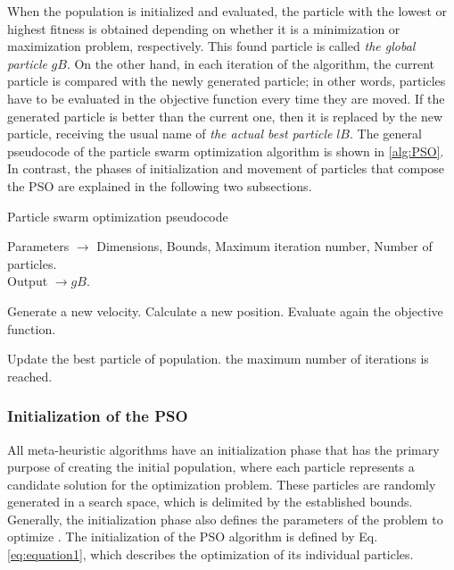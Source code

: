 When the population is initialized and evaluated, the particle with the lowest or highest fitness is obtained depending on whether it is a minimization or maximization problem, respectively. This found particle is called \textit{the global particle} $gB$. On the other hand, in each iteration of the algorithm, the current particle is compared with the newly generated particle; in other words, particles have to be evaluated in the objective function every time they are moved. If the generated particle is better than the current one, then it is replaced by the new particle, receiving the usual name of \textit{the actual best particle} $lB$. The general pseudocode of the particle swarm optimization algorithm is shown in \ref{alg:PSO}. In contrast, the phases of initialization and movement of particles that compose the PSO are explained in the following two subsections.\\

\begin{algorithm}[h!]
\caption{Particle swarm optimization pseudocode}
Parameters $\rightarrow$ Dimensions, Bounds, Maximum iteration number, Number of particles.\\
Output $\rightarrow gB$.   
\begin{algorithmic}[1]
\REPEAT
{}

\STATE Generate a new velocity.
\STATE Calculate a new position.
\STATE Evaluate again the objective function.
\ENDFOR
		
\STATE Update the best particle of population.
\UNTIL the maximum number of iterations is reached.
\end{algorithmic}
\label{alg:PSO}
\end{algorithm}

\newpage

\subsubsection{Initialization of the PSO}

All meta-heuristic algorithms have an initialization phase that has the primary purpose of creating the initial population, where each particle represents a candidate solution for the optimization problem. These particles are randomly generated in a search space, which is delimited by the established bounds. Generally, the initialization phase also defines the parameters of the problem to optimize \cite{erick2021matlab}. The initialization of the PSO algorithm is defined by Eq. \ref{eq:equation1}, which describes the optimization of its individual particles.

